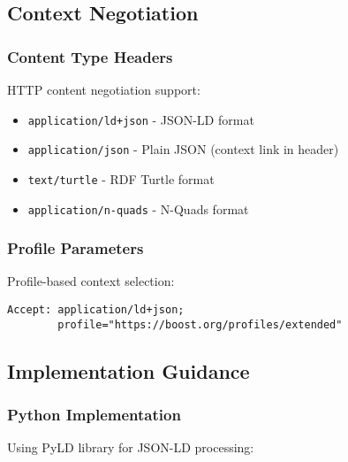 \subsection{Context Negotiation}
\label{sec:context-negotiation}

\subsubsection{Content Type Headers}

HTTP content negotiation support:

\begin{itemize}
    \item \texttt{application/ld+json} - JSON-LD format
    \item \texttt{application/json} - Plain JSON (context link in header)
    \item \texttt{text/turtle} - RDF Turtle format
    \item \texttt{application/n-quads} - N-Quads format
\end{itemize}

\subsubsection{Profile Parameters}

Profile-based context selection:

\begin{verbatim}
Accept: application/ld+json; 
        profile="https://boost.org/profiles/extended"
\end{verbatim}

\subsection{Implementation Guidance}
\label{sec:jsonld-implementation}

\subsubsection{Python Implementation}

Using PyLD library for JSON-LD processing:

